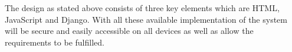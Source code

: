 \documentclass[../main.tex]{subfiles}
\begin{document}
\raggedright
The design as stated above consists of three key elements which are HTML, JavaScript and Django. With all these available implementation of the system will be secure and easily accessible on all devices as well as allow the requirements to be fulfilled. 
\end{document}
